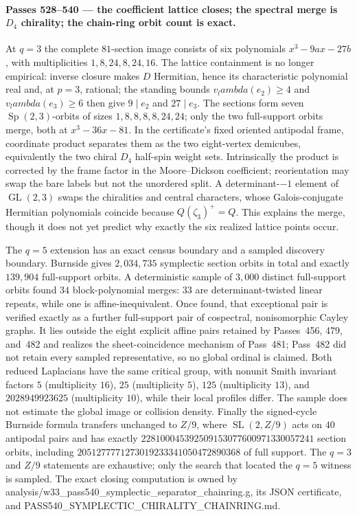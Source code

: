 \documentclass[12pt,a4paper]{article}
\def\mathbb#1{#1}%
\def\texttt#1{#1}%
\def\lambda{lambda}%
\theoremstyle{definition}
\newcommand{\QQ}{\mathbb{Q}}
\newcommand{\ZZ}{\mathbb{Z}}
\begin{document}
\paragraph{Passes 528--540 --- the coefficient lattice closes; the spectral
merge is $D_4$ chirality; the chain-ring orbit count is exact.}
At $q=3$ the complete $81$-section image consists of six polynomials
$x^3-9ax-27b$, with multiplicities $1,8,24,8,24,16$.  The lattice containment
is no longer empirical: inverse closure makes $D$ Hermitian, hence its
characteristic polynomial real and, at $p=3$, rational; the standing bounds
$v_\lambda(e_2)\ge4$ and $v_\lambda(e_3)\ge6$ then give
$9\mid e_2$ and $27\mid e_3$.  The sections form seven
$\operatorname{Sp}(2,3)$-orbits of sizes $1,8,8,8,8,24,24$; only the two
full-support orbits merge, both at $x^3-36x-81$.  In the certificate's fixed
oriented antipodal frame, coordinate product separates them as the two
eight-vertex demicubes, equivalently the two chiral $D_4$ half-spin weight
sets.  Intrinsically the product is corrected by the frame factor in the
Moore--Dickson coefficient; reorientation may swap the bare labels but not the
unordered split.  A determinant-$-1$ element of
$\operatorname{GL}(2,3)$ swaps the chiralities and central characters, whose
Galois-conjugate Hermitian polynomials coincide because
$\QQ(\zeta_3)^+=\QQ$.  This explains the merge, though
it does not yet predict why exactly the six realized lattice points occur.

The $q=5$ extension has an exact census boundary and a sampled discovery
boundary.  Burnside gives $2{,}034{,}735$ symplectic section orbits in total
and exactly $139{,}904$ full-support orbits.  A deterministic sample of
$3{,}000$ distinct full-support orbits found $34$ block-polynomial merges:
$33$ are determinant-twisted linear repeats, while one is affine-inequivalent.
Once found, that exceptional pair is verified exactly as a further
full-support pair of cospectral, nonisomorphic Cayley graphs.  It lies outside
the eight explicit affine pairs retained by Passes~456, 479, and~482 and realizes the
sheet-coincidence mechanism of Pass~481; Pass~482 did not retain every sampled
representative, so no global ordinal is claimed.  Both reduced Laplacians have
the same critical group, with nonunit Smith invariant factors $5$ (multiplicity
$16$), $25$ (multiplicity $5$), $125$ (multiplicity $13$), and
$2028949923625$ (multiplicity $10$), while their local profiles differ.  The
sample does not estimate the global image or collision density.  Finally the signed-cycle Burnside
formula transfers unchanged to
$\ZZ/9$, where $\operatorname{SL}(2,\ZZ/9)$ acts on $40$ antipodal pairs and
has exactly $228100045392509153077600971330057241$ section orbits, including
$2051277771273019233341050472890368$ of full support.  The $q=3$ and
$\ZZ/9$ statements are exhaustive; only the search that located the $q=5$
witness is sampled.  The exact closing computation is owned by
\texttt{analysis/w33\_pass540\_symplectic\_separator\_chainring.g}, its JSON
certificate, and \texttt{PASS540\_SYMPLECTIC\_CHIRALITY\_CHAINRING.md}.
\end{document}
